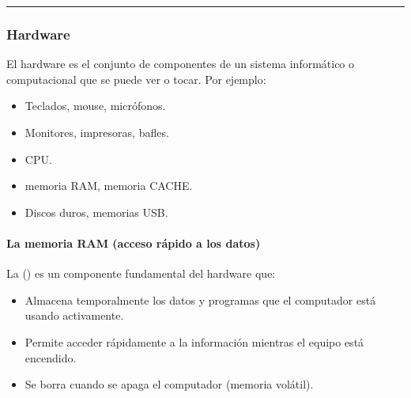 \documentclass[letterpaper,10pt,spanish]{sphinxmanual}
\begin{document}
\bigskip\hrule\bigskip



\subsubsection{Hardware}
\label{\detokenize{1_guias/10programacion/G1022:hardware}}
\sphinxAtStartPar
\sphinxfootnotemark[2] El hardware es el conjunto de componentes de un sistema informático o computacional que se puede ver o tocar. Por ejemplo:
\begin{itemize}
\item {} 
\sphinxAtStartPar
{} Teclados, mouse, micrófonos.

\item {} 
\sphinxAtStartPar
{} Monitores, impresoras, bafles.

\item {} 
\sphinxAtStartPar
{} CPU.

\item {} 
\sphinxAtStartPar
{} memoria RAM, memoria CACHE.

\item {} 
\sphinxAtStartPar
{} Discos duros, memorias USB.

\end{itemize}


\paragraph{La memoria RAM (acceso rápido a los datos)}
\label{\detokenize{1_guias/10programacion/G1022:la-memoria-ram-acceso-rapido-a-los-datos}}
\sphinxAtStartPar
La  () es un componente fundamental del hardware que:
\begin{itemize}
\item {} 
\sphinxAtStartPar
Almacena temporalmente los datos y programas que el computador está usando activamente.

\item {} 
\sphinxAtStartPar
Permite acceder rápidamente a la información mientras el equipo está encendido.

\item {} 
\sphinxAtStartPar
Se borra cuando se apaga el computador (memoria volátil).

\end{itemize}
\end{document}
